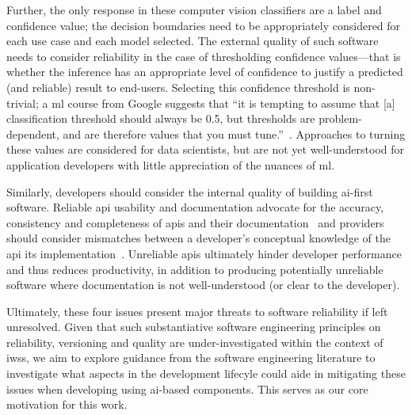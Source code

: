 Further, the only response in these computer vision classifiers are a label and confidence value; the decision boundaries need to be appropriately considered for each use case and each model selected. 
The external quality of such software needs to consider reliability in the case of thresholding confidence values---that is whether the inference has an appropriate level of confidence to justify a predicted (and reliable) result to end-users. Selecting this confidence threshold is non-trivial; a \gls{ml} course from Google suggests that ``it is tempting to assume that [a] classification threshold should always be 0.5, but thresholds are problem-dependent, and are therefore values that you must tune.''~\citep{Classifi7:online}. 
Approaches to turning these values are considered for data scientists, but are not yet well-understood for application developers with little appreciation of the nuances of \gls{ml}. 

Similarly, developers should consider the internal quality of building \gls{ai}-first software. Reliable \gls{api} usability and documentation advocate for the accuracy, consistency and completeness of \glspl{api} and their documentation~\citep{Piccioni:2013em,Robillard:2009uk} and providers should consider mismatches between a developer's conceptual knowledge of the \gls{api} its implementation~\citep{Ko:2011fb}. Unreliable \glspl{api} ultimately hinder developer performance and thus reduces productivity, in addition to producing potentially unreliable software where documentation is not well-understood (or clear to the developer).

Ultimately, these four issues present major threats to software reliability if left unresolved. Given that such substantiative software engineering principles on reliability, versioning and quality  are under-investigated within the context of \glspl{iws}, we aim to explore guidance from the software engineering literature to investigate what aspects in the development lifecyle could aide in mitigating these issues when developing using \gls{ai}-based components. This serves as our core motivation for this work.

%
%

